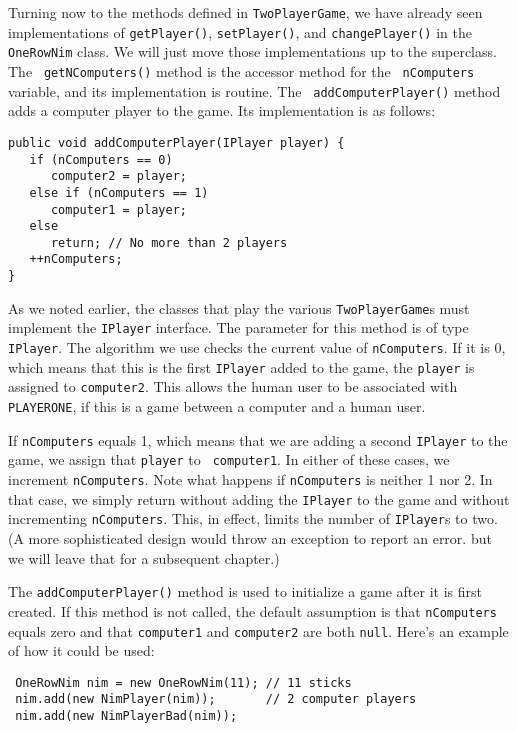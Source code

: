 Turning now to the methods defined in {\tt TwoPlayerGame}, we have
already seen implementations of {\tt getPlayer()}, {\tt setPlayer()},
and {\tt changePlayer()} in the {\tt OneRowNim} class.  We will just
move those implementations up to the superclass. The {\tt
getNComputers()} method is the accessor method for the {\tt
nComputers} variable, and its implementation is routine.  The {\tt
addComputerPlayer()} method adds a computer player to the
game. Its implementation is as follows:

\begin{jjjlisting}
\begin{lstlisting}
public void addComputerPlayer(IPlayer player) {
   if (nComputers == 0)
      computer2 = player;
   else if (nComputers == 1)
      computer1 = player;
   else 
      return; // No more than 2 players
   ++nComputers;
}
\end{lstlisting}
\end{jjjlisting}

\noindent As we noted earlier, the classes that play the various
{\tt TwoPlayerGame}s must implement the {\tt IPlayer} interface.
The parameter for this method is of type {\tt IPlayer}.  The
algorithm we use checks the current value of {\tt nComputers}.
If it is 0, which means that this is the first {\tt IPlayer}
added to the game, the {\tt player} is assigned to {\tt computer2}.
This allows the human user to be associated with {\tt PLAYER\-ONE}, if 
this is a game between a computer and a human user.

If {\tt nComputers} equals 1, which means that we are adding a second
{\tt IPlayer} to the game, we assign that {\tt player} to {\tt
computer1}.  In either of these cases, we increment {\tt nComputers}.
Note what happens if {\tt nComputers} is neither 1 nor 2. In that
case, we simply return without adding the {\tt IPlayer} to the game
and without incrementing {\tt nComputers}. This, in effect, limits the
number of {\tt IPlayer}s to two.  (A more sophisticated design would
throw an exception to report an error. but we will leave that for
a subsequent chapter.)

The {\tt addComputerPlayer()} method is used to initialize a 
game after it is first created. If this method is not called,
the default assumption is that {\tt nComputers} equals zero
and that {\tt computer1} and {\tt computer2} are both {\tt null}.
Here's an example of how it could be used:

\begin{jjjlisting}
\begin{lstlisting}
 OneRowNim nim = new OneRowNim(11); // 11 sticks
 nim.add(new NimPlayer(nim));       // 2 computer players
 nim.add(new NimPlayerBad(nim));
\end{lstlisting}
\end{jjjlisting}

